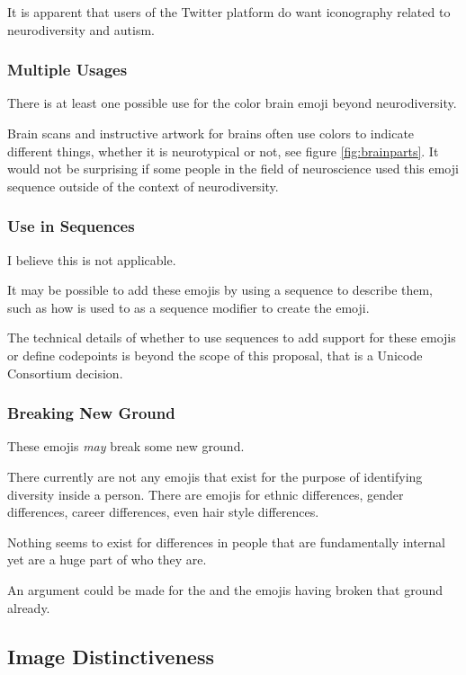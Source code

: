 It is apparent that users of the Twitter platform do want iconography related to neurodiversity
and autism.


\subsubsection{Multiple Usages}

There is at least one possible use for the color brain emoji beyond neurodiversity.

Brain scans and instructive artwork for brains often use colors to indicate different things,
whether it is neurotypical or not, see figure \ref{fig:brainparts}. It would not be surprising
if some people in the field of neuroscience used this emoji sequence outside of the context
of neurodiversity.


\subsubsection{Use in Sequences}

I believe this is not applicable.

It may be possible to add these emojis by using a sequence to describe them, such as how
\rainbow{} is used to as a sequence modifier to create the
\prideflag{} emoji.

The technical details of whether to use sequences to add support for these emojis or define
codepoints is beyond the scope of this proposal, that is a Unicode Consortium decision.

\subsubsection{Breaking New Ground}

These emojis \emph{may} break some new ground.

There currently are not any emojis that exist for the purpose of identifying diversity inside
a person. There are emojis for ethnic differences, gender differences, career differences,
even hair style differences.

Nothing seems to exist for differences in people that are fundamentally internal yet are a
huge part of who they are.

An argument could be made for the \nerdface{} and the
\prideflag{} emojis having broken that ground already.

\subsection{Image Distinctiveness}

